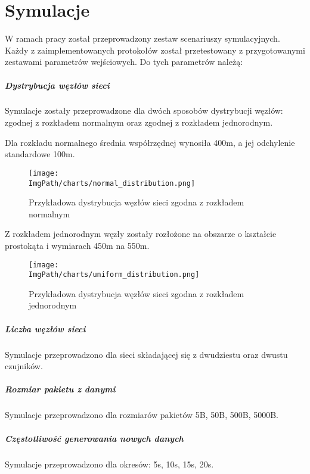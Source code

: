 \chapter{Symulacje}
W ramach pracy został przeprowadzony zestaw scenariuszy symulacyjnych. Każdy z zaimplementowanych protokołów został przetestowany z przygotowanymi zestawami parametrów wejściowych.
Do tych parametrów należą:
\paragraph{Dystrybucja węzłów sieci}
Symulacje zostały przeprowadzone dla dwóch sposobów dystrybucji węzłów: zgodnej z rozkładem normalnym oraz zgodnej z rozkładem jednorodnym.

Dla rozkładu normalnego średnia współrzędnej wynosiła 400m, a jej odchylenie standardowe 100m.

\begin{figure}[!htbp]
	\begin{center}
		\texttt{[image: \\ImgPath/charts/normal\_distribution.png]}
	\end{center}
	\caption{Przykładowa dystrybucja węzłów sieci zgodna z rozkładem normalnym}
\end{figure}

Z rozkładem jednorodnym węzły zostały rozłożone na obszarze o kształcie prostokąta i wymiarach 450m na 550m.

\begin{figure}[!htbp]
	\begin{center}
		\texttt{[image: \\ImgPath/charts/uniform\_distribution.png]}
	\end{center}
	\caption{Przykładowa dystrybucja węzłów sieci zgodna z rozkładem jednorodnym}
\end{figure}

\paragraph{Liczba węzłów sieci}
Symulacje przeprowadzono dla sieci składającej się z dwudziestu oraz dwustu czujników.
\paragraph{Rozmiar pakietu z danymi}
Symulacje przeprowadzono dla rozmiarów pakietów 5B, 50B, 500B, 5000B.
\paragraph{Częstotliwość generowania nowych danych}
Symulacje przeprowadzono dla okresów: 5s, 10s, 15s, 20s.
